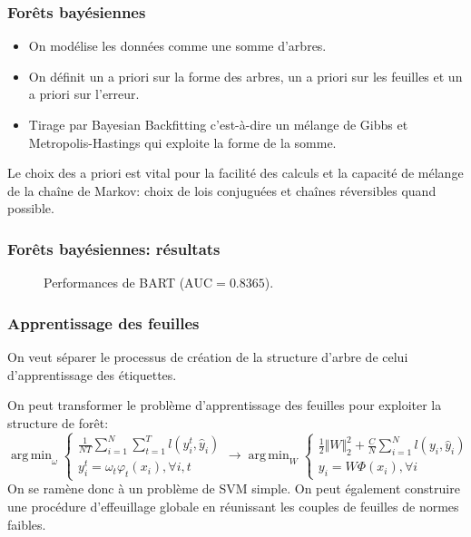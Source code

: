 \documentclass[dvipsnames,10pt]{beamer}
\DeclareMathOperator*{\argmin}{arg\,min}
\theoremstyle{plain}
\theoremstyle{definition}
\begin{document}
\begin{frame}
\frametitle{Forêts bayésiennes}
\begin{itemize}
    \item On modélise les données comme une somme d'arbres.
    \item On définit un a priori sur la forme des arbres, un a priori sur les feuilles et un a priori sur l'erreur.
    \item Tirage par Bayesian Backfitting c'est-à-dire un mélange de Gibbs et Metropolis-Hastings qui exploite la forme de la somme.
\end{itemize}

Le choix des a priori est vital pour la facilité des calculs et la capacité de mélange de la chaîne de Markov: choix de lois conjuguées et chaînes réversibles quand possible.
\end{frame}

\begin{frame}
\frametitle{Forêts bayésiennes: résultats}
\begin{figure}[H]
\centering
    \caption{Performances de BART ($\mathrm{AUC} = 0.8365$).}
\end{figure}
\end{frame}

\begin{frame}
\frametitle{Apprentissage des feuilles}
On veut séparer le processus de création de la structure d'arbre de celui d'apprentissage des étiquettes.

On peut transformer le problème d'apprentissage des feuilles pour exploiter la structure de forêt:
\begin{equation*}
\argmin_\omega \begin{cases}
        \frac{1}{N T} \sum_{i=1}^N \sum_{t=1}^T l(y_i^t , \hat{y}_i ) \\
        y_i^t = \omega_t \varphi_t (x_i ) , \forall i , t
\end{cases}
\longrightarrow
\argmin_W \begin{cases}
         \frac{1}{2} \Vert W \Vert^2_2 + \frac{C}{N} \sum_{i=1}^N l(y_i , \hat{y}_i ) \\
        y_i = W \Phi (x_i ) , \forall i
\end{cases}
\end{equation*}
On se ramène donc à un problème de SVM simple. On peut également construire une procédure d'effeuillage globale en réunissant les couples de feuilles de normes faibles.
\end{frame}
\end{document}
